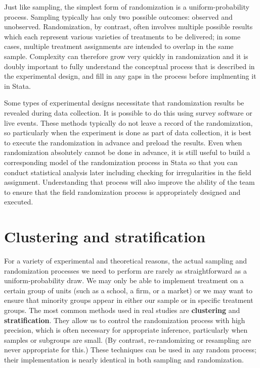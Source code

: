 Just like sampling, the simplest form of randomization is a uniform-probability process.
Sampling typically has only two possible outcomes: observed and unobserved.
Randomization, by contrast, often involves multiple possible results
which each represent various varieties of treatments to be delivered;
in some cases, multiple treatment assignments are intended to overlap in the same sample.
Complexity can therefore grow very quickly in randomization
and it is doubly important to fully understand the conceptual process
that is described in the experimental design,
and fill in any gaps in the process before implmenting it in Stata.

Some types of experimental designs necessitate that randomization results be revealed during data collection.
It is possible to do this using survey software or live events.
These methods typically do not leave a record of the randomization,
so particularly when the experiment is done as part of data collection,
it is best to execute the randomization in advance and preload the results.
Even when randomization absolutely cannot be done in advance, it is still useful
to build a corresponding model of the randomization process in Stata
so that you can conduct statistical analysis later
including checking for irregularities in the field assignment.
Understanding that process will also improve the ability of the team
to ensure that the field randomization process is appropriately designed and executed.


\section{Clustering and stratification}

For a variety of experimental and theoretical reasons,
the actual sampling and randomization processes we need to perform
are rarely as straightforward as a uniform-probability draw.
We may only be able to implement treatment on a certain group of units
(such as a school, a firm, or a market)
or we may want to ensure that minority groups appear
in either our sample or in specific treatment groups.
The most common methods used in real studies are \textbf{clustering} and \textbf{stratification}.
They allow us to control the randomization process with high precision,
which is often necessary for appropriate inference,
particularly when samples or subgroups are small.\cite{athey2017econometrics}
(By contrast, re-randomizing or resampling are never appropriate for this.\cite{bruhn2009pursuit})
These techniques can be used in any random process;
their implementation is nearly identical in both sampling and randomization.


